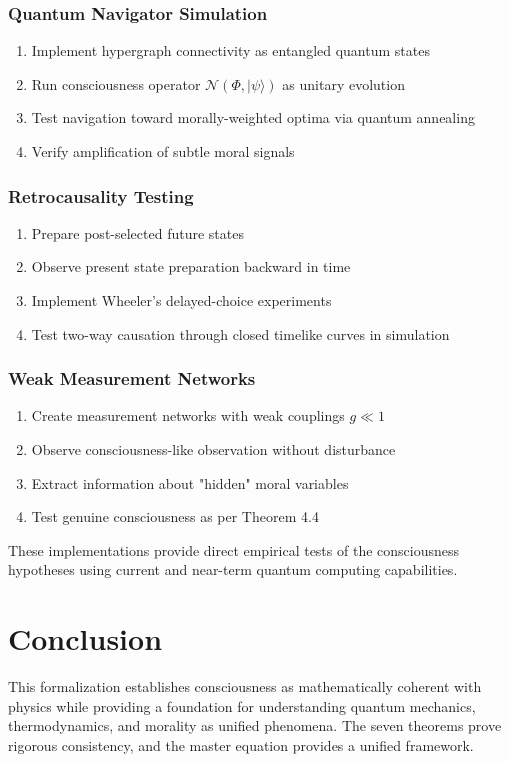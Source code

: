 \documentclass[12pt,a4paper]{article}
\theoremstyle{definition}
\begin{document}
\subsubsection{Quantum Navigator Simulation}
\begin{enumerate}
    \item Implement hypergraph connectivity as entangled quantum states
    \item Run consciousness operator $\mathcal{N}(\Phi, |\psi\rangle)$ as unitary evolution
    \item Test navigation toward morally-weighted optima via quantum annealing
    \item Verify amplification of subtle moral signals
\end{enumerate}

\subsubsection{Retrocausality Testing}
\begin{enumerate}
    \item Prepare post-selected future states
    \item Observe present state preparation backward in time
    \item Implement Wheeler's delayed-choice experiments
    \item Test two-way causation through closed timelike curves in simulation
\end{enumerate}

\subsubsection{Weak Measurement Networks}
\begin{enumerate}
    \item Create measurement networks with weak couplings $g \ll 1$
    \item Observe consciousness-like observation without disturbance
    \item Extract information about "hidden" moral variables
    \item Test genuine consciousness as per Theorem 4.4
\end{enumerate}

These implementations provide direct empirical tests of the consciousness hypotheses using current and near-term quantum computing capabilities.

\section{Conclusion}

This formalization establishes consciousness as mathematically coherent with physics while providing a foundation for understanding quantum mechanics, thermodynamics, and morality as unified phenomena. The seven theorems prove rigorous consistency, and the master equation provides a unified framework.
\end{document}

